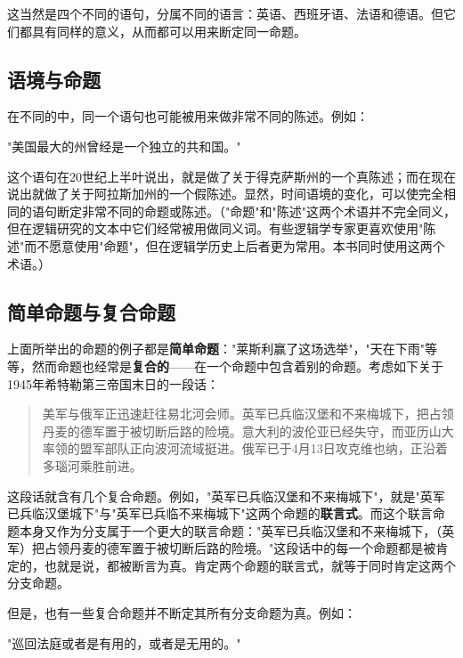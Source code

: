 这当然是四个不同的语句，分属不同的语言：英语、西班牙语、法语和德语。但它们都具有同样的意义，从而都可以用来断定同一命题。

\subsection{语境与命题}

在不同的中，同一个语句也可能被用来做非常不同的陈述。例如：

\begin{center}
"美国最大的州曾经是一个独立的共和国。"
\end{center}

这个语句在20世纪上半叶说出，就是做了关于得克萨斯州的一个真陈述；而在现在说出就做了关于阿拉斯加州的一个假陈述。显然，时间语境的变化，可以使完全相同的语句断定非常不同的命题或陈述。（"命题"和"陈述"这两个术语并不完全同义，但在逻辑研究的文本中它们经常被用做同义词。有些逻辑学专家更喜欢使用"陈述"而不愿意使用"命题"，但在逻辑学历史上后者更为常用。本书同时使用这两个术语。）

\subsection{简单命题与复合命题}

上面所举出的命题的例子都是\textbf{简单命题}："莱斯利赢了这场选举"，"天在下雨"等等，然而命题也经常是\textbf{复合的}——在一个命题中包含着别的命题。考虑如下关于1945年希特勒第三帝国末日的一段话：

\begin{quotation}
美军与俄军正迅速赶往易北河会师。英军已兵临汉堡和不来梅城下，把占领丹麦的德军置于被切断后路的险境。意大利的波伦亚已经失守，而亚历山大率领的盟军部队正向波河流域挺进。俄军已于4月13日攻克维也纳，正沿着多瑙河乘胜前进。\cite{shirer1960}
\end{quotation}

这段话就含有几个复合命题。例如，"英军已兵临汉堡和不来梅城下"，就是"英军已兵临汉堡城下"与"英军已兵临不来梅城下"这两个命题的\textbf{联言式}。而这个联言命题本身又作为分支属于一个更大的联言命题："英军已兵临汉堡和不来梅城下，（英军）把占领丹麦的德军置于被切断后路的险境。"这段话中的每一个命题都是被肯定的，也就是说，都被断言为真。肯定两个命题的联言式，就等于同时肯定这两个分支命题。

但是，也有一些复合命题并不断定其所有分支命题为真。例如：

\begin{center}
"巡回法庭或者是有用的，或者是无用的。"\cite{lincoln1861}
\end{center}

